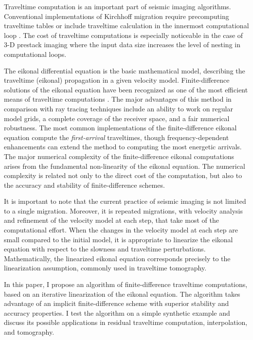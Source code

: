Traveltime computation is an important part of seismic imaging
algorithms. Conventional implementations of Kirchhoff migration
require precomputing traveltime tables or include traveltime
calculation in the innermost computational loop .  The cost of
traveltime computations is especially noticeable in the case of 3-D
prestack imaging where the input data size increases the level of
nesting in computational loops.
\par
The eikonal differential equation is the basic mathematical model,
describing the traveltime (eikonal) propagation in a given velocity
model.  Finite-difference solutions of the eikonal equation have been
recognized as one of the most efficient means of traveltime
computations
\cite[]{GEO55-05-05210526,GEO56-06-08120821,Popovici.sep.70.245}.  The
major advantages of this method in comparison with ray tracing
techniques include an ability to work on regular model grids, a
complete coverage of the receiver space, and a fair numerical
robustness. The most common implementations of the finite-difference
eikonal equation compute the \emph{first-arrival} traveltimes, though
frequency-dependent enhancements
\cite[]{SEG-1992-1315,Nichols.sepphd.81} can extend the method to
computing the most energetic arrivals. The major numerical complexity
of the finite-difference eikonal computations arises from the
fundamental non-linearity of the eikonal equation. The numerical
complexity is related not only to the direct cost of the computation,
but also to the accuracy and stability of finite-difference schemes.
\par
It is important to note that the current practice of seismic imaging
is not limited to a single migration. Moreover, it is repeated
migrations, with velocity analysis and refinement of the velocity
model at each step, that take most of the computational effort. When
the changes in the velocity model at each step are small compared to
the initial model, it is appropriate to linearize the eikonal equation
with respect to the slowness and traveltime perturbations.
Mathematically, the linearized eikonal equation corresponds precisely
to the linearization assumption, commonly used in traveltime
tomography.
\par
In this paper, I propose an algorithm of finite-difference traveltime
computations, based on an iterative linearization of the eikonal
equation. The algorithm takes advantage of an implicit
finite-difference scheme with superior stability and accuracy
properties.  I test the algorithm on a simple synthetic example and
discuss its possible applications in residual traveltime computation,
interpolation, and tomography.


